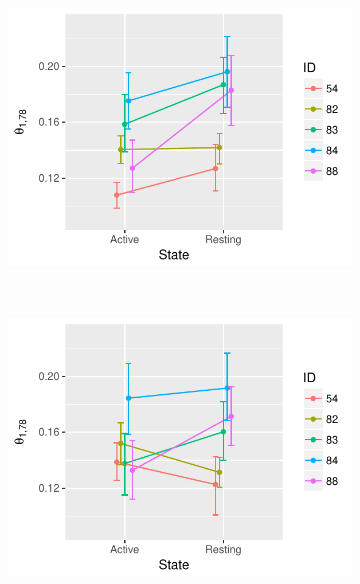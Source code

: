 \documentclass{article}
\begin{document}
\begin{figure}
    \centering
    \begin{subfigure}[b]{0.3\textwidth}
        \includegraphics[width=\textwidth]{fmri.pdf}
        \caption{}
        \label{fig:fmri}
    \end{subfigure}
    ~ %
    \begin{subfigure}[b]{0.3\textwidth}
        \includegraphics[width=\textwidth]{fmriHier.pdf}
        \caption{}
        \label{fig:fmriHier}
    \end{subfigure}
    ~ %

\end{figure}
\end{document}
